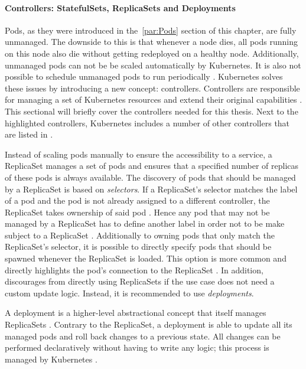 \paragraph{Controllers: StatefulSets, ReplicaSets and Deployments}%
\label{par:Controllers}
Pods, as they were introduced in the~\ref{par:Pods} section of this chapter,
are fully unmanaged. The downside to this is that whenever a node dies, all
pods running on this node also die without getting redeployed on a healthy
node. Additionally, unmanaged pods can not be be scaled automatically by
Kubernetes. It is also not possible to schedule unmanaged pods to run
periodically \autocite[Ch. 4]{LuksaKubernetesAction2017}. Kubernetes solves
these issues by introducing a new concept: controllers. Controllers are
responsible for managing a set of Kubernetes resources and extend their
original capabilities \autocite{AuthorsConcepts2019}. This sectional will
briefly cover the controllers needed for this thesis. Next to the highlighted
controllers, Kubernetes includes a number of other controllers that are listed
in \autocite{AuthorsConcepts2019}.

Instead of scaling pods manually to ensure the accessibility to a service, a
ReplicaSet manages a set of pods and ensures that a specified number of
replicas of these pods is always available. The discovery of pods that should
be managed by a ReplicaSet is based on \textit{selectors}. If a ReplicaSet's
selector matches the label of a pod and the pod is not already assigned to a
different controller, the ReplicaSet takes ownership of said pod \autocite[Ch.
4]{LuksaKubernetesAction2017}. Hence any pod that may not be managed by a
ReplicaSet has to define another label in order not to be make subject to a
ReplicaSet \autocite{AuthorsReplicaSet2019}. Additionally to owning pods that
only match the ReplicaSet's selector, it is possible to directly specify pods
that should be spawned whenever the ReplicaSet is loaded. This option is more
common and directly highlights the pod's connection to the ReplicaSet
\autocite{AuthorsReplicaSet2019}. In addition, \autocite{AuthorsReplicaSet2019}
discourages from directly using ReplicaSets if the use case does not need a
custom update logic. Instead, it is recommended to use \textit{deployments}.

A deployment is a higher-level abstractional concept that itself manages
ReplicaSets \autocite{AuthorsReplicaSet2019}. Contrary to the ReplicaSet, a
deployment is able to update all its managed pods and roll back changes to a
previous state. All changes can be performed declaratively without having to
write any logic; this process is managed by Kubernetes \autocite[Ch.
9]{LuksaKubernetesAction2017}.

